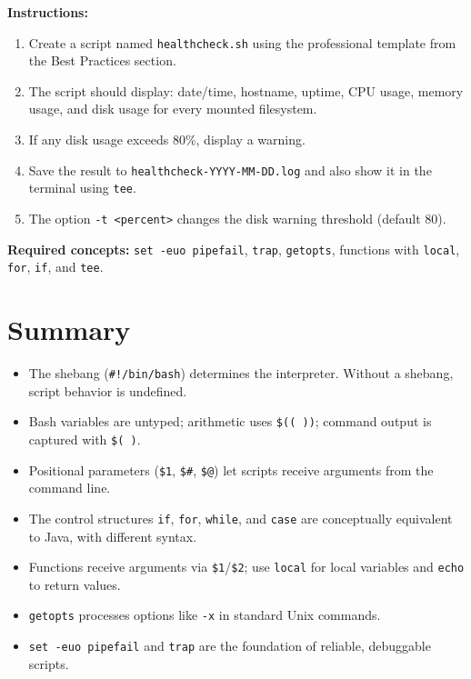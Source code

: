 \textbf{Instructions:}
\begin{enumerate}
  \item Create a script named \texttt{healthcheck.sh} using the professional
    template from the Best Practices section.
  \item The script should display: date/time, hostname, uptime, CPU usage,
    memory usage, and disk usage for every mounted filesystem.
  \item If any disk usage exceeds 80\%, display a warning.
  \item Save the result to \texttt{healthcheck-YYYY-MM-DD.log} and also show
    it in the terminal using \texttt{tee}.
  \item The option \texttt{-t <percent>} changes the disk warning threshold
    (default 80).
\end{enumerate}

\textbf{Required concepts:} \texttt{set -euo pipefail}, \texttt{trap},
\texttt{getopts}, functions with \texttt{local}, \texttt{for},
\texttt{if}, and \texttt{tee}.

\section{Summary}
\label{sec:summary-bash-prog}

\begin{itemize}
  \item The shebang (\texttt{\#!/bin/bash}) determines the interpreter.
    Without a shebang, script behavior is undefined.
  \item Bash variables are untyped; arithmetic uses \texttt{\$(( ))}; command
    output is captured with \texttt{\$( )}.
  \item Positional parameters (\texttt{\$1}, \texttt{\$\#}, \texttt{\$@})
    let scripts receive arguments from the command line.
  \item The control structures \texttt{if}, \texttt{for}, \texttt{while},
    and \texttt{case} are conceptually equivalent to Java, with different
    syntax.
  \item Functions receive arguments via \texttt{\$1}/\texttt{\$2}; use
    \texttt{local} for local variables and \texttt{echo} to return values.
  \item \texttt{getopts} processes options like \texttt{-x} in standard Unix
    commands.
  \item \texttt{set -euo pipefail} and \texttt{trap} are the foundation of
    reliable, debuggable scripts.
\end{itemize}

